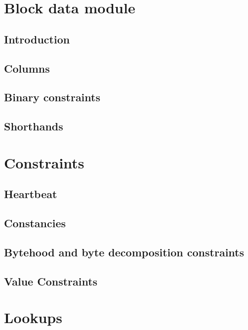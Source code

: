 

\section{Block data module}
\subsection{Introduction}                                   \label{block data: intro}                 
\subsection{Columns}                                        \label{block data: columns}               
\subsection{Binary constraints}                             \label{block data: binarities}            
\subsection{Shorthands}                                     \label{block data: shorthands}            

\section{Constraints}
\subsection{Heartbeat}                                      \label{block data: heartbeat}             
\subsection{Constancies}                                    \label{block data: constancies}           
\subsection{Bytehood and byte decomposition constraints}    \label{block data: byte decomposition}    
\subsection{Value Constraints}                              \label{block data: value constraints}     

\section{Lookups}                                           \label{block data: lookups}               

	
